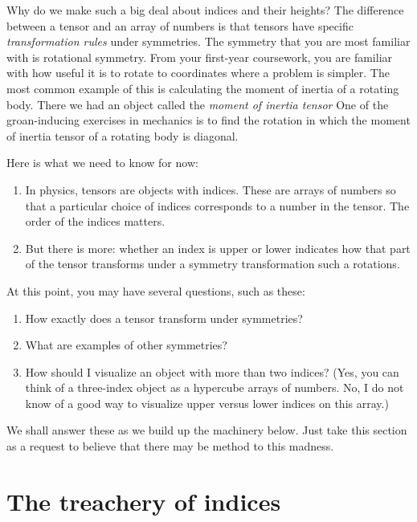 \documentclass[12pt, oneside]{report}    %
\let\oldsection\section
\def\section{%
  \setcounter{sidenote}{1}%
  \oldsection
}
\begin{document}
Why do we make such a big deal about indices and their heights? The difference between a tensor and an array of numbers is that tensors have specific \emph{transformation rules} under symmetries. The symmetry that you are most familiar with is rotational symmetry. From your first-year coursework, you are familiar with how useful it is to rotate to coordinates where a problem is simpler. The most common example of this is calculating the moment of inertia of a rotating body. There we had an object called the \emph{moment of inertia tensor} One of the groan-inducing exercises in mechanics is to find the rotation in which the moment of inertia tensor of a rotating body is diagonal.

Here is what we need to know for now:
\begin{enumerate}
    \item In physics, tensors are objects with indices. These are arrays of numbers so that a particular choice of indices corresponds to a number in the tensor. The order of the indices matters.
    \item But there is more: whether an index is upper or lower indicates how that part of the tensor transforms under a symmetry transformation such a rotations. 
\end{enumerate}
At this point, you may have several questions, such as these:
\begin{enumerate}
    \item How exactly does a tensor transform under symmetries?
    \item What are examples of other symmetries?
    \item How should I visualize an object with more than two indices? (Yes, you can think of a three-index object as a hypercube arrays of numbers. No, I do not know of a good way to visualize upper versus lower indices on this array.)
\end{enumerate}
We shall answer these as we build up the machinery below. Just take this section as a request to believe that there may be method to this madness.

\section{The treachery of indices}
\label{sec:treachery:of:indices:vi:is:not:a:vector}
\end{document}
